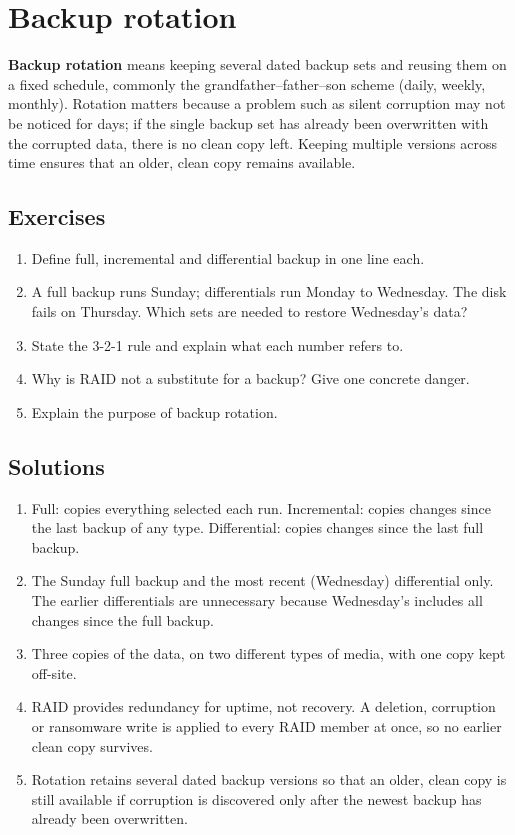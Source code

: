 \documentclass[11pt]{article}
\begin{document}
\section{Backup rotation}
\textbf{Backup rotation} means keeping several dated backup sets and reusing
them on a fixed schedule, commonly the grandfather--father--son scheme (daily,
weekly, monthly). Rotation matters because a problem such as silent
corruption may not be noticed for days; if the single backup set has already
been overwritten with the corrupted data, there is no clean copy left.
Keeping multiple versions across time ensures that an older, clean copy
remains available.

\subsection*{Exercises}
\begin{enumerate}[label=\arabic*.]
  \item Define full, incremental and differential backup in one line each.
  \item A full backup runs Sunday; differentials run Monday to Wednesday. The
    disk fails on Thursday. Which sets are needed to restore Wednesday's
    data?
  \item State the 3-2-1 rule and explain what each number refers to.
  \item Why is RAID not a substitute for a backup? Give one concrete danger.
  \item Explain the purpose of backup rotation.
\end{enumerate}

\subsection*{Solutions}
\begingroup\small
\begin{enumerate}[label=\arabic*.]
  \item Full: copies everything selected each run. Incremental: copies changes
    since the last backup of any type. Differential: copies changes since the
    last full backup.
  \item The Sunday full backup and the most recent (Wednesday) differential
    only. The earlier differentials are unnecessary because Wednesday's
    includes all changes since the full backup.
  \item Three copies of the data, on two different types of media, with one
    copy kept off-site.
  \item RAID provides redundancy for uptime, not recovery. A deletion,
    corruption or ransomware write is applied to every RAID member at once,
    so no earlier clean copy survives.
  \item Rotation retains several dated backup versions so that an older, clean
    copy is still available if corruption is discovered only after the newest
    backup has already been overwritten.
\end{enumerate}
\endgroup
\end{document}
